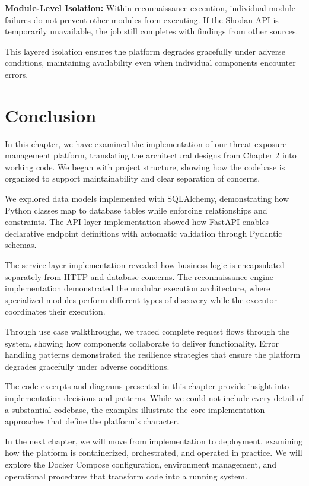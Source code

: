 \documentclass[a4paper,12pt]{report}
\begin{document}
\textbf{Module-Level Isolation:} Within reconnaissance execution, individual module failures do not prevent other modules from executing. If the Shodan API is temporarily unavailable, the job still completes with findings from other sources.\hfill \break

This layered isolation ensures the platform degrades gracefully under adverse conditions, maintaining availability even when individual components encounter errors.\hfill \break

\section*{Conclusion}

In this chapter, we have examined the implementation of our threat exposure management platform, translating the architectural designs from Chapter 2 into working code. We began with project structure, showing how the codebase is organized to support maintainability and clear separation of concerns.\hfill \break

We explored data models implemented with SQLAlchemy, demonstrating how Python classes map to database tables while enforcing relationships and constraints. The API layer implementation showed how FastAPI enables declarative endpoint definitions with automatic validation through Pydantic schemas.\hfill \break

The service layer implementation revealed how business logic is encapsulated separately from HTTP and database concerns. The reconnaissance engine implementation demonstrated the modular execution architecture, where specialized modules perform different types of discovery while the executor coordinates their execution.\hfill \break

Through use case walkthroughs, we traced complete request flows through the system, showing how components collaborate to deliver functionality. Error handling patterns demonstrated the resilience strategies that ensure the platform degrades gracefully under adverse conditions.\hfill \break

The code excerpts and diagrams presented in this chapter provide insight into implementation decisions and patterns. While we could not include every detail of a substantial codebase, the examples illustrate the core implementation approaches that define the platform's character.\hfill \break

In the next chapter, we will move from implementation to deployment, examining how the platform is containerized, orchestrated, and operated in practice. We will explore the Docker Compose configuration, environment management, and operational procedures that transform code into a running system.\hfill \break
\end{document}
